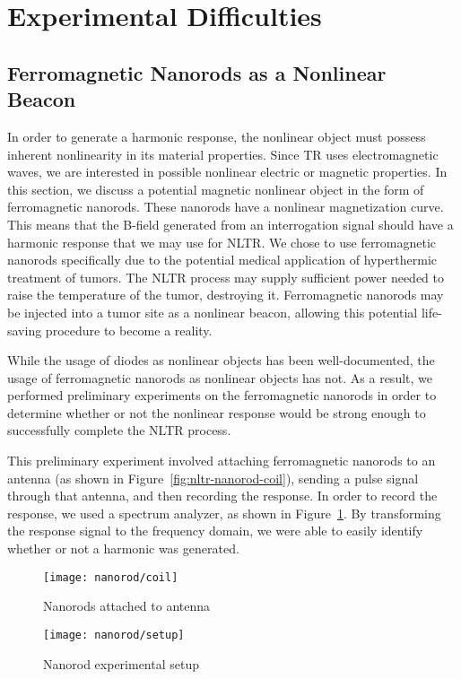 \section{Experimental Difficulties}
\label{sec:nltr-expr-diff}

\subsection{Ferromagnetic Nanorods as a Nonlinear Beacon}

In order to generate a harmonic response, the nonlinear object must possess inherent nonlinearity in its material properties. Since TR uses electromagnetic waves, we are interested in possible nonlinear electric or magnetic properties. In this section, we discuss a potential magnetic nonlinear object in the form of ferromagnetic nanorods. These nanorods have a nonlinear magnetization curve. This means that the B-field generated from an interrogation signal should have a harmonic response that we may use for NLTR. We chose to use ferromagnetic nanorods specifically due to the potential medical application of hyperthermic treatment of tumors. The NLTR process may supply sufficient power needed to raise the temperature of the tumor, destroying it. Ferromagnetic nanorods may be injected into a tumor site as a nonlinear beacon, allowing this potential life-saving procedure to become a reality.

While the usage of diodes as nonlinear objects has been well-documented, the usage of ferromagnetic nanorods as nonlinear objects has not. As a result, we performed preliminary experiments on the ferromagnetic nanorods in order to determine whether or not the nonlinear response would be strong enough to successfully complete the NLTR process.

This preliminary experiment involved attaching ferromagnetic nanorods to an antenna (as shown in Figure~\ref{fig:nltr-nanorod-coil}), sending a pulse signal through that antenna, and then recording the response. In order to record the response, we used a spectrum analyzer, as shown in Figure~\ref{fig:nltr-nanorod-setup}. By transforming the response signal to the frequency domain, we were able to easily identify whether or not a harmonic was generated.

\begin{figure}[t]
    \centering
    \begin{minipage}[b]{.4\textwidth}
        \centering
        \texttt{[image: nanorod/coil]}
        \caption[Nanorods attached to antenna]{Nanorods attached to antenna}
        \label{fig:nltr-nanorod-coil}
    \end{minipage}
    \hfill
    \begin{minipage}[b]{.4\textwidth}
        \centering
        \texttt{[image: nanorod/setup]}
        \caption[Nanorod experimental setup]{Nanorod experimental setup}
        \label{fig:nltr-nanorod-setup}
    \end{minipage}
\end{figure}


